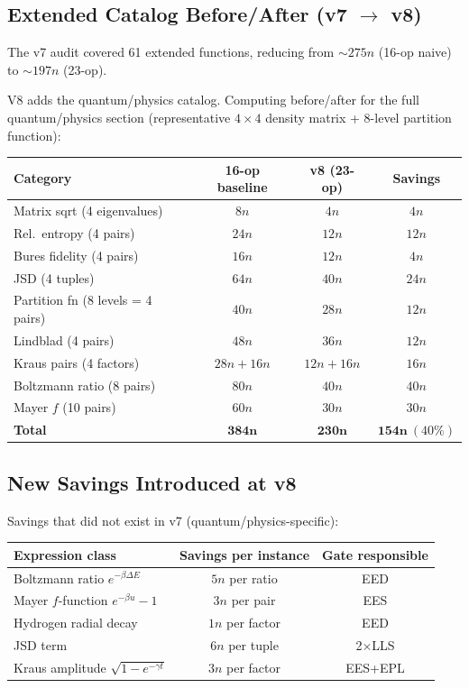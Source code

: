 \documentclass[11pt]{article}
\begin{document}
\subsection{Extended Catalog Before/After (v7 $\to$ v8)}

The v7 audit covered 61 extended functions, reducing from $\sim275n$ (16-op naive) to $\sim197n$ (23-op).

V8 adds the quantum/physics catalog. Computing before/after for the full quantum/physics
section (representative $4\times4$ density matrix + 8-level partition function):

\begin{center}
\begin{tabular}{lccc}
\toprule
Category & 16-op baseline & v8 (23-op) & Savings \\
\midrule
Matrix sqrt (4 eigenvalues) & $8n$ & $4n$ & $4n$ \\
Rel.\ entropy (4 pairs) & $24n$ & $12n$ & $12n$ \\
Bures fidelity (4 pairs) & $16n$ & $12n$ & $4n$ \\
JSD (4 tuples) & $64n$ & $40n$ & $24n$ \\
Partition fn (8 levels = 4 pairs) & $40n$ & $28n$ & $12n$ \\
Lindblad (4 pairs) & $48n$ & $36n$ & $12n$ \\
Kraus pairs (4 factors) & $28n+16n$ & $12n+16n$ & $16n$ \\
Boltzmann ratio (8 pairs) & $80n$ & $40n$ & $40n$ \\
Mayer $f$ (10 pairs) & $60n$ & $30n$ & $30n$ \\
\midrule
\textbf{Total} & $\mathbf{384n}$ & $\mathbf{230n}$ & $\mathbf{154n}\ (40\%)$ \\
\bottomrule
\end{tabular}
\end{center}

\subsection{New Savings Introduced at v8}

Savings that did not exist in v7 (quantum/physics-specific):

\begin{center}
\begin{tabular}{lcc}
\toprule
Expression class & Savings per instance & Gate responsible \\
\midrule
Boltzmann ratio $e^{-\beta\Delta E}$ & $5n$ per ratio & EED \\
Mayer $f$-function $e^{-\beta u}-1$ & $3n$ per pair & EES \\
Hydrogen radial decay & $1n$ per factor & EED \\
JSD term & $6n$ per tuple & 2$\times$LLS \\
Kraus amplitude $\sqrt{1-e^{-\gamma t}}$ & $3n$ per factor & EES+EPL \\
\bottomrule
\end{tabular}
\end{center}
\end{document}
